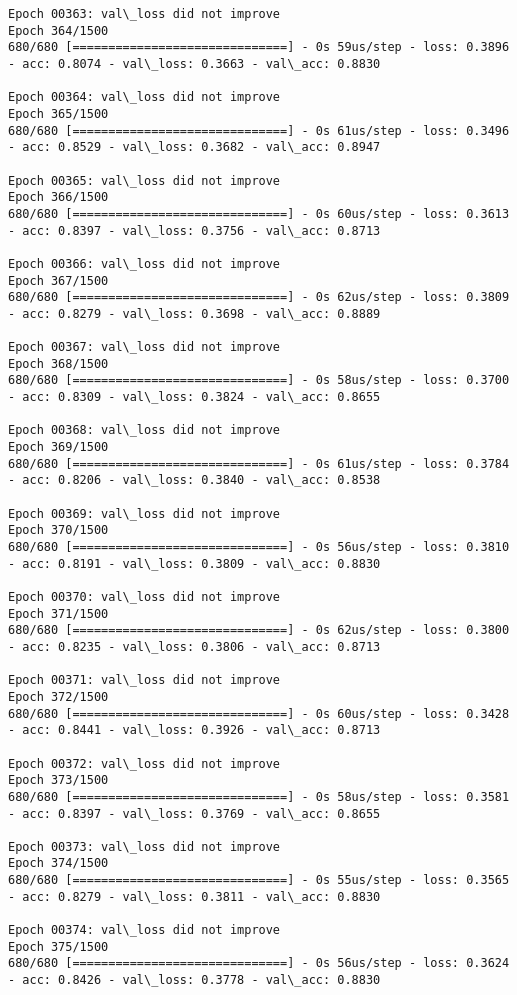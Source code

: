 \documentclass[11pt]{article}
\begin{document}
\begin{Verbatim}[commandchars=\\\{\}]
Epoch 00363: val\_loss did not improve
Epoch 364/1500
680/680 [==============================] - 0s 59us/step - loss: 0.3896 - acc: 0.8074 - val\_loss: 0.3663 - val\_acc: 0.8830

Epoch 00364: val\_loss did not improve
Epoch 365/1500
680/680 [==============================] - 0s 61us/step - loss: 0.3496 - acc: 0.8529 - val\_loss: 0.3682 - val\_acc: 0.8947

Epoch 00365: val\_loss did not improve
Epoch 366/1500
680/680 [==============================] - 0s 60us/step - loss: 0.3613 - acc: 0.8397 - val\_loss: 0.3756 - val\_acc: 0.8713

Epoch 00366: val\_loss did not improve
Epoch 367/1500
680/680 [==============================] - 0s 62us/step - loss: 0.3809 - acc: 0.8279 - val\_loss: 0.3698 - val\_acc: 0.8889

Epoch 00367: val\_loss did not improve
Epoch 368/1500
680/680 [==============================] - 0s 58us/step - loss: 0.3700 - acc: 0.8309 - val\_loss: 0.3824 - val\_acc: 0.8655

Epoch 00368: val\_loss did not improve
Epoch 369/1500
680/680 [==============================] - 0s 61us/step - loss: 0.3784 - acc: 0.8206 - val\_loss: 0.3840 - val\_acc: 0.8538

Epoch 00369: val\_loss did not improve
Epoch 370/1500
680/680 [==============================] - 0s 56us/step - loss: 0.3810 - acc: 0.8191 - val\_loss: 0.3809 - val\_acc: 0.8830

Epoch 00370: val\_loss did not improve
Epoch 371/1500
680/680 [==============================] - 0s 62us/step - loss: 0.3800 - acc: 0.8235 - val\_loss: 0.3806 - val\_acc: 0.8713

Epoch 00371: val\_loss did not improve
Epoch 372/1500
680/680 [==============================] - 0s 60us/step - loss: 0.3428 - acc: 0.8441 - val\_loss: 0.3926 - val\_acc: 0.8713

Epoch 00372: val\_loss did not improve
Epoch 373/1500
680/680 [==============================] - 0s 58us/step - loss: 0.3581 - acc: 0.8397 - val\_loss: 0.3769 - val\_acc: 0.8655

Epoch 00373: val\_loss did not improve
Epoch 374/1500
680/680 [==============================] - 0s 55us/step - loss: 0.3565 - acc: 0.8279 - val\_loss: 0.3811 - val\_acc: 0.8830

Epoch 00374: val\_loss did not improve
Epoch 375/1500
680/680 [==============================] - 0s 56us/step - loss: 0.3624 - acc: 0.8426 - val\_loss: 0.3778 - val\_acc: 0.8830


\end{Verbatim}
\end{document}

